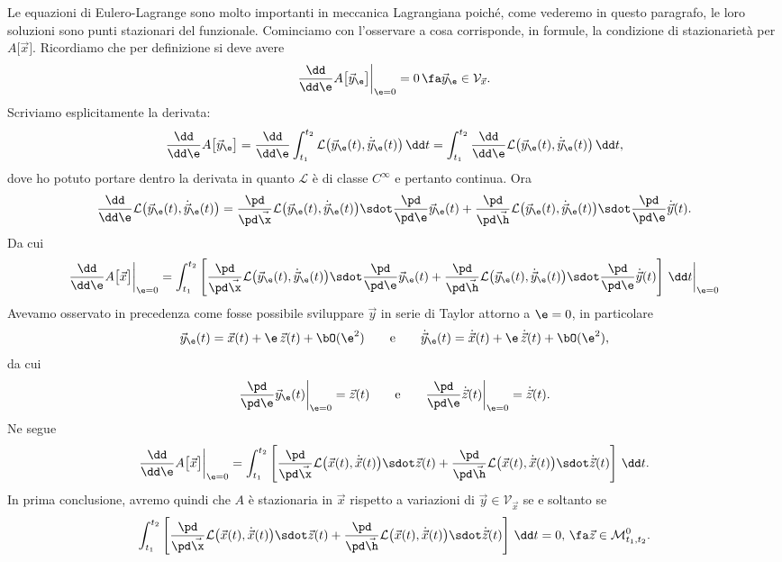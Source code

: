 Le equazioni di Eulero-Lagrange sono molto importanti in meccanica Lagrangiana poiché, come vederemo in questo paragrafo, le loro soluzioni sono punti stazionari del funzionale.
Cominciamo con l'osservare a cosa corrisponde, in formule, la condizione di stazionarietà per \(A\big[\vec{x}\big]\). Ricordiamo che per definizione si deve avere
\[
	\frac{\dd}{\dd\e} A\big[\vec{y}_\e\big] \bigg|_{\e=0} = 0\,\fa \vec{y}_\e\in \mathcal{V}_{\vec{x}}.
\]
Scriviamo esplicitamente la derivata:
\[
	\frac{\dd}{\dd\e} A\big[\vec{y}_\e\big] = \frac{\dd}{\dd\e}\int_{t_1}^{t_2} \mathcal{L}\big(\vec{y}_\e(t),\dot{\vec{y}}_\e(t)\big)\,\dd t = \int_{t_1}^{t_2} \frac{\dd}{\dd \e}\mathcal{L}\big(\vec{y}_\e(t),\dot{\vec{y}}_\e(t)\big)\,\dd t,
\]
dove ho potuto portare dentro la derivata in quanto \(\mathcal{L}\) è di classe \(C^{\infty}\) e pertanto continua. Ora
\[
	\frac{\dd}{\dd\e}\mathcal{L}\big(\vec{y}_\e(t),\dot{\vec{y}}_\e(t)\big) = \frac{\pd}{\pd\vec{\x}}\mathcal{L}\big(\vec{y}_\e(t),\dot{\vec{y}}_\e(t)\big)\sdot \frac{\pd}{\pd\e}\vec{y}_\e(t) + \frac{\pd}{\pd\vec{\h}}\mathcal{L}\big(\vec{y}_\e(t),\dot{\vec{y}}_\e(t)\big) \sdot \frac{\pd}{\pd\e}\dot{\vec{y}}(t).
\]
Da cui
\[
	\frac{\dd}{\dd\e} A\big[\vec{x}\big] \bigg|_{\e=0} = \int_{t_1}^{t_2}\left[\frac{\pd}{\pd\vec{\x}}\mathcal{L}\big(\vec{y}_\e(t),\dot{\vec{y}}_\e(t)\big)\sdot \frac{\pd}{\pd\e}\vec{y}_\e(t) + \frac{\pd}{\pd\vec{\h}}\mathcal{L}\big(\vec{y}_\e(t),\dot{\vec{y}}_\e(t)\big) \sdot \frac{\pd}{\pd\e}\dot{\vec{y}}(t)\right]\,\dd t \bigg|_{\e=0}
\]
Avevamo osservato in precedenza come fosse possibile sviluppare \(\vec{y}\) in serie di Taylor attorno a \(\e=0\), in particolare
\[
	\vec{y}_\e(t) = \vec{x}(t) + \e\,\vec{z}(t) + \bO(\e^2) \qquad\text{e}\qquad \dot{\vec{y}}_\e(t) = \dot{\vec{x}}(t) + \e\,\dot{\vec{z}}(t) + \bO(\e^2),
\]
da cui
\[
	\frac{\pd}{\pd\e}\vec{y}_\e(t) \bigg|_{\e=0} = \vec{z}(t) \qquad\text{e}\qquad \frac{\pd}{\pd\e}\dot{\vec{z}}(t) \bigg|_{\e=0} = \dot{\vec{z}}(t).
\]
Ne segue
\[
	\frac{\dd}{\dd\e} A\big[\vec{x}\big] \bigg|_{\e=0} = \int_{t_1}^{t_2}\left[\frac{\pd}{\pd\vec{\x}}\mathcal{L}\big(\vec{x}(t),\dot{\vec{x}}(t)\big)\sdot \vec{z}(t) + \frac{\pd}{\pd\vec{\h}}\mathcal{L}\big(\vec{x}(t),\dot{\vec{x}}(t)\big) \sdot \dot{\vec{z}}(t)\right]\,\dd t.
\]
In prima conclusione, avremo quindi che \(A\) è stazionaria in \(\vec{x}\) rispetto a variazioni di \(\vec{y}\in \mathcal{V}_{\vec{x}}\) se e soltanto se
\[
	\int_{t_1}^{t_2}\left[\frac{\pd}{\pd\vec{\x}}\mathcal{L}\big(\vec{x}(t),\dot{\vec{x}}(t)\big)\sdot \vec{z}(t) + \frac{\pd}{\pd\vec{\h}}\mathcal{L}\big(\vec{x}(t),\dot{\vec{x}}(t)\big) \sdot \dot{\vec{z}}(t)\right]\,\dd t = 0, \,\fa \vec{z} \in \mathcal{M}_{t_1,t_2}^0.
\]
